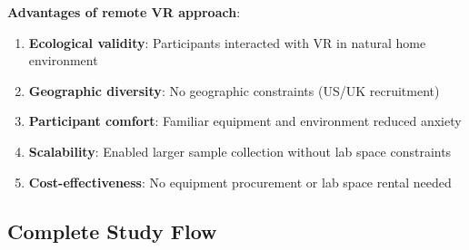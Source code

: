 \documentclass[12pt]{article}
\begin{document}
\textbf{Advantages of remote VR approach}:
\begin{enumerate}
    \item \textbf{Ecological validity}: Participants interacted with VR in natural home environment
    \item \textbf{Geographic diversity}: No geographic constraints (US/UK recruitment)
    \item \textbf{Participant comfort}: Familiar equipment and environment reduced anxiety
    \item \textbf{Scalability}: Enabled larger sample collection without lab space constraints
    \item \textbf{Cost-effectiveness}: No equipment procurement or lab space rental needed
\end{enumerate}

\subsection{Complete Study Flow}
\end{document}
